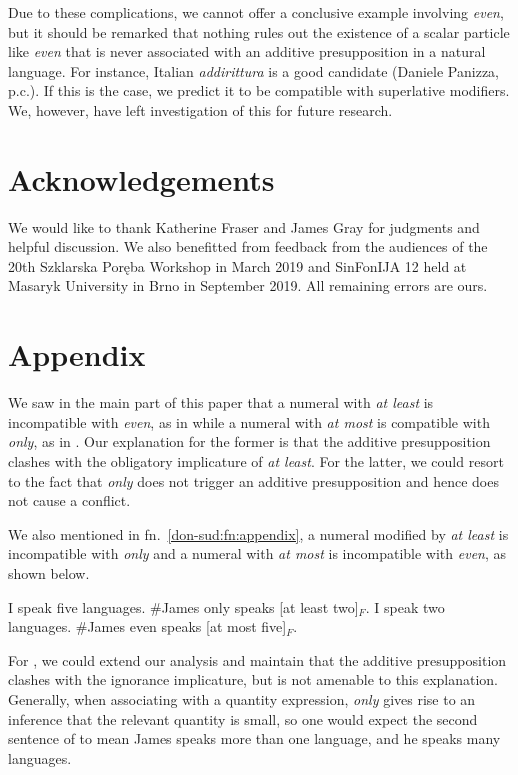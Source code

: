 \documentclass[output=paper]{langscibook}
\begin{document}
Due to these complications, we cannot offer a conclusive example involving \textit{even}, but it should be remarked that nothing rules out the existence of a scalar particle like \textit{even} that is never associated with an additive presupposition in a natural language. For instance, Italian \textit{addirittura} is a good candidate (Daniele Panizza, p.c.). If this is the case, we predict it to be compatible with superlative modifiers. We, however, have left investigation of this for future research.


\section*{Acknowledgements}

We would like to thank Katherine Fraser and James Gray for judgments and helpful discussion. We also benefitted from feedback from the audiences of the 20th Szklarska Poręba Workshop in March 2019 and SinFonIJA 12 held at Masaryk University in Brno in September 2019. All remaining errors are ours.


\section*{Appendix}

We saw in the main part of this paper that a numeral with \textit{at least} is incompatible with \textit{even}, as in  while a numeral with \textit{at most} is compatible with \textit{only}, as in . Our explanation for the former is that the additive presupposition clashes with the obligatory implicature of \textit{at least}. For the latter, we could resort to the fact that \textit{only} does not trigger an additive presupposition and hence does not cause a conflict.

We also mentioned in fn.~\ref{don-sud:fn:appendix}, a numeral modified by \textit{at least} is incompatible with \textit{only} and a numeral with \textit{at most} is incompatible with \textit{even}, as shown below.

\ea
  \ea I speak five languages. \#James only speaks [at least two]$_F$.\label{don-sud:onlyatleast}
  \ex I speak two languages. \#James even speaks [at most five]$_F$.\label{don-sud:evenatmost}
  \z
\z

\noindent For , we could extend our analysis and maintain that the additive presupposition clashes with the ignorance implicature, but  is not amenable to this explanation. Generally, when associating with a quantity expression, \textit{only} gives rise to an inference that the relevant quantity is small, so one would expect the second sentence of  to mean James speaks more than one language, and he speaks many languages.
\end{document}
